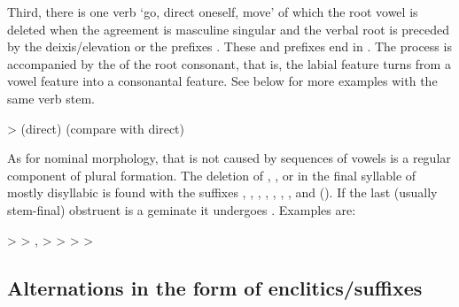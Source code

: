 Third, there is one verb `go, direct oneself, move' of which the root vowel  is deleted when the  agreement is masculine singular and the verbal root is preceded by the deixis/elevation  or the  prefixes . These  and prefixes end in . The process is accompanied by the  of the root consonant, that is, the labial feature turns from a vowel feature into a consonantal feature. See  below for more examples with the same verb stem.
%
\begin{exe}
	\ex	{} >  \newline\hspace*{1em}(direct) (compare with  direct)	\label{ex:habulqan phon}
\end{exe}

As for nominal morphology,  that is not caused by sequences of vowels is a regular component of plural formation. The deletion of , , or  in the final syllable of mostly disyllabic  is found with the suffixes , , , , , , , and  (). If the last (usually stem-final) obstruent is a geminate it undergoes . Examples are:
%
\begin{exe}
	\ex	\label{ex:vowel syncope nouns phon}
	\begin{xlist}
		\ex	{} >  
		\ex	{} >  ,
		\ex	{} >  
		\ex	{} >  
		\ex	{} >  
		\ex	{} >  
	\end{xlist}
\end{exe}



\subsection{Alternations in the form of enclitics\slash suffixes}
\label{ssec:Alternations in the form of enclitics / suffixes}

